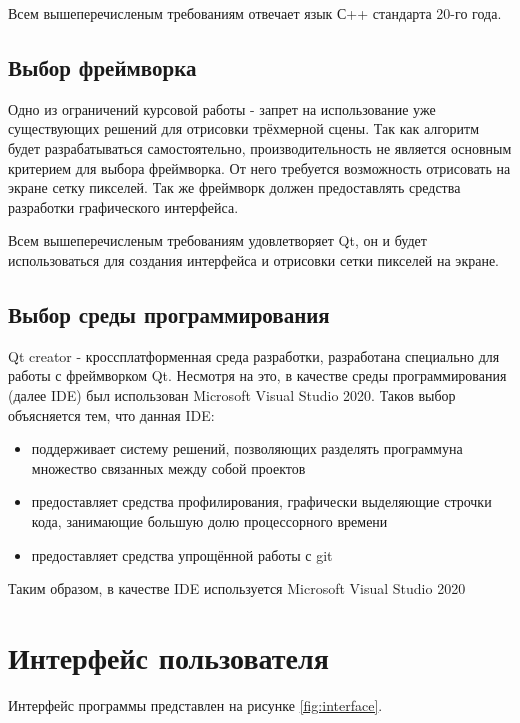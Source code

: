 \documentclass[a4paper, 14pt]{report} %
\begin{document}
	Всем вышеперечисленым требованиям отвечает язык С++ стандарта 20-го года.
	
	\subsection{Выбор фреймворка}
	Одно из ограничений курсовой работы - запрет на использование уже существующих решений для отрисовки трёхмерной сцены. Так как алгоритм будет разрабатываться самостоятельно, производительность не является основным критерием для выбора фреймворка. От него требуется возможность отрисовать на экране сетку пикселей. Так же фреймворк должен предоставлять средства разработки графического интерфейса.
	
	Всем вышеперечисленым требованиям удовлетворяет Qt, он и будет использоваться для создания интерфейса и отрисовки сетки пикселей на экране.
	
	\subsection{Выбор среды программирования}
	Qt creator - кроссплатформенная среда разработки, разработана специально для работы с фреймворком Qt. Несмотря на это, в качестве среды программирования (далее IDE) был использован Microsoft Visual Studio 2020. Таков выбор объясняется тем, что данная IDE:
	
	\begin{itemize}
		\item поддерживает систему решений, позволяющих разделять программуна множество связанных между собой проектов
		\item предоставляет средства профилирования, графически выделяющие строчки кода, занимающие большую долю процессорного времени
		\item предоставляет средства упрощённой работы с git
	\end{itemize}
	
	Таким образом, в качестве IDE используется Microsoft Visual Studio 2020
	
	\section{Интерфейс пользователя}
	Интерфейс программы представлен на рисунке \ref{fig:interface}.
	
\end{document}
